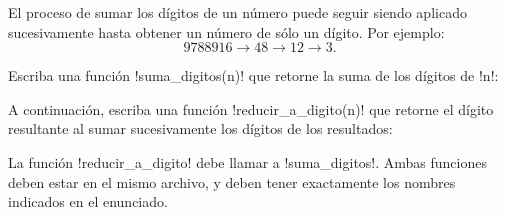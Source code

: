 \documentclass[12pt,spanish,letterpaper]{article}
\begin{document}
  El proceso de sumar los dígitos de un número
  puede seguir siendo aplicado sucesivamente
  hasta obtener un número de sólo un dígito.
  Por ejemplo:
  \[ 9788916 \to 48 \to 12 \to 3. \]

  Escriba una función \li!suma_digitos(n)!
  que retorne la suma de los dígitos de \li!n!:

  
  
  A continuación,
  escriba una función \li!reducir_a_digito(n)!
  que retorne el dígito resultante
  al sumar sucesivamente
  los dígitos de los resultados:

  

  La función \li!reducir_a_digito!
  debe llamar a \li!suma_digitos!.
  Ambas funciones deben estar en el mismo archivo,
  y deben tener exactamente los nombres indicados en el enunciado.
\end{document}
